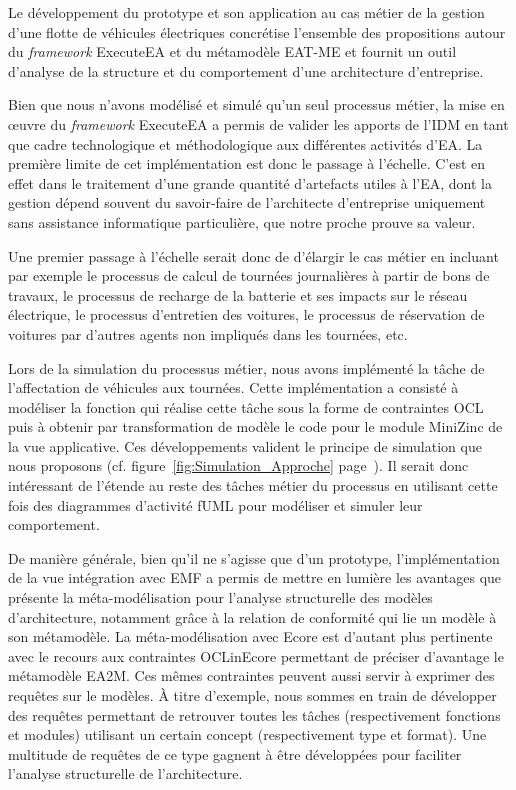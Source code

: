     Le développement du prototype et son application au cas métier
    de la gestion d'une flotte de véhicules électriques concrétise l'ensemble des
    propositions autour du \emph{framework} ExecuteEA et du métamodèle EAT-ME
    et fournit un outil d'analyse de la structure et du comportement
    d'une architecture d'entreprise.

    Bien que nous n'avons modélisé et simulé qu'un seul processus métier, la mise
    en œuvre du \emph{framework} ExecuteEA a permis de valider les apports de l'IDM
    en tant que cadre technologique et méthodologique aux différentes activités d'EA.
    La première limite de cet implémentation est donc le passage à l'échelle. C'est en effet dans le
    traitement d'une grande quantité d'artefacts utiles à l'EA, dont la gestion dépend souvent du 
    savoir-faire de l'architecte d'entreprise uniquement
    sans assistance informatique particulière, que notre  proche prouve sa valeur.

    Une premier passage à l'échelle serait donc de d'élargir le cas métier en incluant par exemple
    le processus de calcul de tournées journalières à partir de bons de travaux, le processus
    de recharge de la batterie et ses impacts sur le réseau électrique, le processus d'entretien des
    voitures, le processus de réservation de voitures par d'autres agents non impliqués dans les tournées,
    etc. 

    Lors de la simulation du processus métier, nous avons implémenté la
    tâche de l'affectation de véhicules aux tournées. Cette implémentation a consisté à modéliser
    la fonction qui réalise cette tâche sous la forme de contraintes OCL puis à obtenir par transformation
    de modèle le code pour le module MiniZinc de la vue applicative. 
    Ces développements valident le principe
    de simulation que nous proposons (cf. figure~\ref{fig:Simulation_Approche} page~\pageref{fig:Simulation_Approche}).
    Il serait donc intéressant de l'étende au reste des tâches métier du processus en utilisant cette fois des diagrammes
    d'activité fUML pour modéliser et simuler leur comportement.

    De manière générale, bien qu'il ne s'agisse que d'un prototype, l'implémentation de la vue intégration avec EMF
    a permis de mettre en lumière les avantages que présente la méta-modélisation pour l'analyse structurelle
    des modèles d'architecture, notamment grâce à la relation de conformité qui lie un modèle à son métamodèle.
    La méta-modélisation avec Ecore est d'autant plus pertinente avec le recours aux contraintes OCLinEcore
    permettant de préciser d'avantage le métamodèle EA2M. Ces mêmes contraintes peuvent aussi servir à
    exprimer des requêtes sur le modèles. À titre d'exemple, nous sommes en train de développer des requêtes
    permettant de retrouver toutes les tâches (respectivement
    fonctions et modules) utilisant un certain concept (respectivement type et format). Une multitude de requêtes de ce
    type gagnent à être développées pour faciliter l'analyse structurelle de l'architecture.

